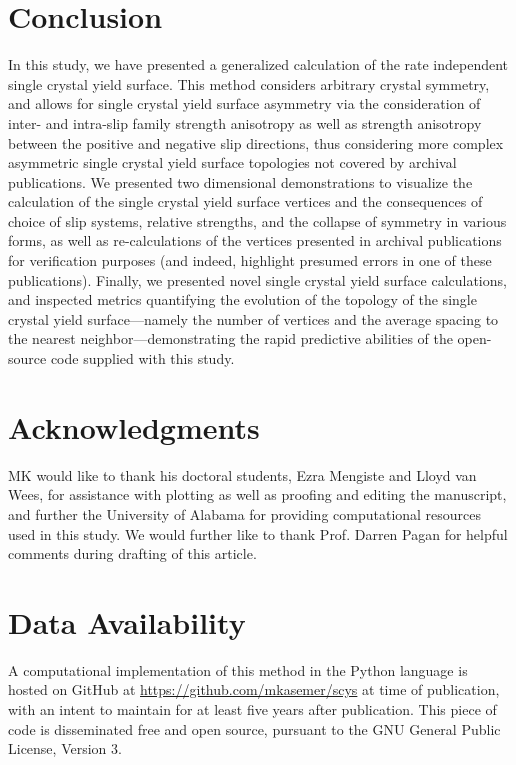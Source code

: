 \documentclass[preprint,3p,times,sort&compress,letterpaper,12pt]{elsarticle} %
\begin{document}
\section{Conclusion}
\label{sec:conclusion}

In this study, we have presented a generalized calculation of the rate independent single crystal yield surface. This method considers arbitrary crystal symmetry, and allows for single crystal yield surface asymmetry via the consideration of inter- and intra-slip family strength anisotropy as well as strength anisotropy between the positive and negative slip directions, thus considering more complex asymmetric single crystal yield surface topologies not covered by archival publications. We presented two dimensional demonstrations to visualize the calculation of the single crystal yield surface vertices and the consequences of choice of slip systems, relative strengths, and the collapse of symmetry in various forms, as well as re-calculations of the vertices presented in archival publications for verification purposes (and indeed, highlight presumed errors in one of these publications). Finally, we presented novel single crystal yield surface calculations, and inspected metrics quantifying the evolution of the topology of the single crystal yield surface---namely the number of vertices and the average spacing to the nearest neighbor---demonstrating the rapid predictive abilities of the open-source code supplied with this study.

\section*{Acknowledgments}
\label{sec:acknowledgments}

MK would like to thank his doctoral students, Ezra Mengiste and Lloyd van Wees, for assistance with plotting as well as proofing and editing the manuscript, and further the University of Alabama for providing computational resources used in this study. We would further like to thank Prof. Darren Pagan for helpful comments during drafting of this article.

\section*{Data Availability}
\label{sec:data}

A computational implementation of this method in the Python language is hosted on GitHub at \url{https://github.com/mkasemer/scys} at time of publication, with an intent to maintain for at least five years after publication. This piece of code is disseminated free and open source, pursuant to the GNU General Public License, Version 3.
\end{document}
